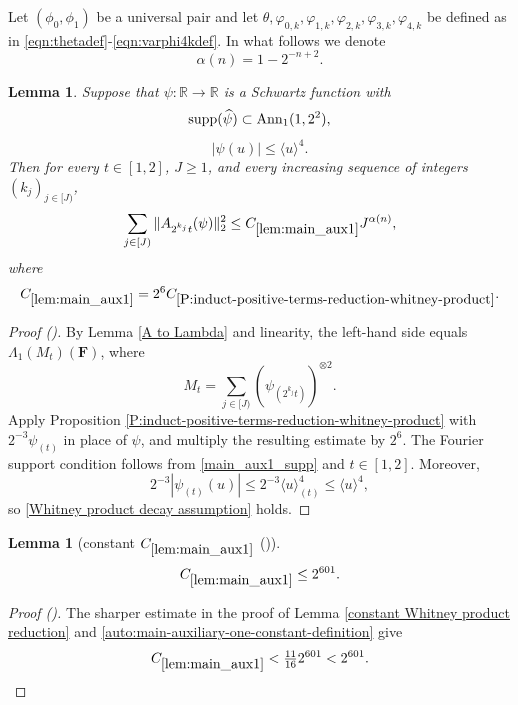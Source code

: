 \documentclass[12pt,reqno]{amsart}
\newcommand{\auto}{{({\tiny\faCar})}}
\theoremstyle{plain}
\newtheorem{lemma}[theorem]{Lemma}
\numberwithin{equation}{section}
\theoremstyle{remark}
\newcommand{\using}[1]{}
\newcommand{\R}{{\mathbb R}}
\newcommand{\F}{\mathbf{F}}
\begin{document}
Let $(\phi_0, \phi_1)$ be a universal pair
and let $\theta, \varphi_{0,k}, \varphi_{1,k}, \varphi_{2,k}, \varphi_{3,k}, \varphi_{4,k}$ be defined as in \eqref{eqn:thetadef}-\eqref{eqn:varphi4kdef}.
In what follows we denote
\begin{equation}\label{variation exponent alpha}
\alpha(n)=1-2^{-n+2}.
\end{equation}

\begin{lemma}\label{lem:main_aux1}\using{A to Lambda}\using{P:induct-positive-terms-reduction-whitney-product}
Suppose that $\psi:\R\to\R$ is a Schwartz function with
\begin{equation}\label{main_aux1_supp}
{\rm supp}(\widehat\psi)\subset\mathrm{Ann}_1(1,2^2),
\end{equation}
\begin{equation}\label{main_aux1_decay}
|\psi(u)|\le\langle u\rangle^4.
\end{equation}
Then for every $t\in[1,2]$, $J\ge1$, and every increasing sequence of integers $(k_j)_{j\in[J)}$,
\begin{equation}\label{main_aux1}
\sum_{j\in[J)}\|A_{2^{k_j}t}(\psi)\|_2^2
\le C_{\ref{lem:main_aux1}}J^{\alpha(n)},
\end{equation}
where
\begin{equation}\label{auto:main-auxiliary-one-constant-definition}
C_{\ref{lem:main_aux1}}
=2^6C_{\ref{P:induct-positive-terms-reduction-whitney-product}}.
\end{equation}
\end{lemma}

\begin{proof}[Proof \auto]
By Lemma \ref{A to Lambda} and linearity, the left-hand side equals $\Lambda_1(M_t)(\F)$, where
\[
M_t=\sum_{j\in[J)}(\psi_{(2^{k_j}t)})^{\otimes2}.
\]
Apply Proposition \ref{P:induct-positive-terms-reduction-whitney-product} with $2^{-3}\psi_{(t)}$ in place of $\psi$, and multiply the resulting estimate by $2^6$. The Fourier support condition follows from \eqref{main_aux1_supp} and $t\in[1,2]$. Moreover,
\[
2^{-3}|\psi_{(t)}(u)|
\le2^{-3}\langle u\rangle_{(t)}^4
\le\langle u\rangle^4,
\]
so \eqref{Whitney product decay assumption} holds.
\end{proof}

\begin{lemma}[constant $C_{\ref{lem:main_aux1}}$ \auto]\label{constant main auxiliary one}\using{constant Whitney product reduction}\using{lem:main_aux1}
\begin{equation}\label{constant main auxiliary one bound}
C_{\ref{lem:main_aux1}}\le2^{601}.
\end{equation}
\end{lemma}
\begin{proof}[Proof \auto]
The sharper estimate in the proof of Lemma \ref{constant Whitney product reduction} and \eqref{auto:main-auxiliary-one-constant-definition} give
\[
C_{\ref{lem:main_aux1}}<\tfrac{11}{16}2^{601}<2^{601}.
\]
\end{proof}
\end{document}
